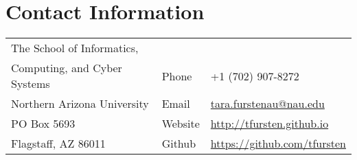 \documentclass[11pt]{article}
\begin{document}
\section*{Contact Information}
\begin{tabular}[c]{p{3.5in}ll}
The School of Informatics,\\Computing, and Cyber Systems& Phone & +1 (702) 907-8272\\
Northern Arizona University& Email & \href{mailto:tara.furstenau@nau.edu}{tara.furstenau@nau.edu}\\
PO Box 5693 & Website & \href{http://tfursten.github.io}{http://tfursten.github.io}\\
Flagstaff, AZ 86011& Github &\href{https://github.com/tfursten}{https://github.com/tfursten}\\
\end{tabular}


\end{document}
